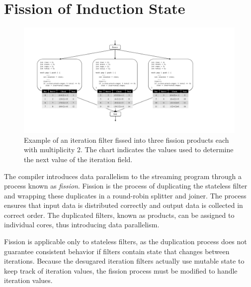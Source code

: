 \section{Fission of Induction State}
\label{sec:fission}


\begin{figure}[t!]
\centering
\includegraphics[width=6.5in]{figures/fission-example.pdf}
\caption{Example of an iteration filter fissed into three fission products each with multiplicity 2.  The chart indicates the values used to determine the next value of the iteration field.  \protect\label{fig:fission-example}}
\end{figure}

The compiler introduces data parallelism to the streaming program through a process known as {\it fission}.  Fission is the process of duplicating the stateless filter and wrapping these duplicates in a round-robin splitter and joiner.  The process ensures that input data is distributed correctly and output data is collected in correct order.  The duplicated filters, known as products, can be assigned to individual cores, thus introducing data parallelism.  

Fission is applicable only to stateless filters, as the duplication process does not guarantee consistent behavior if filters contain state that changes between iterations.  Because the desugared iteration filters actually use mutable state to keep track of iteration values, the fission process must be modified to handle iteration values.  


